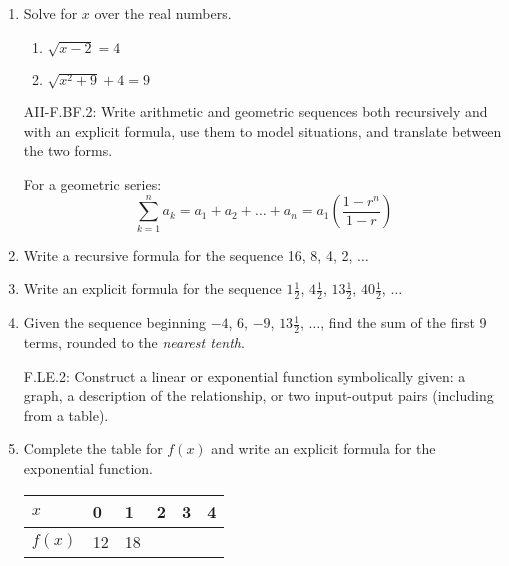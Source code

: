 \documentclass[12pt, twoside]{article}
\begin{document}
\begin{enumerate}[itemsep=0.5cm]
\item Solve for $x$ over the real numbers.
    \begin{multicols}{2}
    \begin{enumerate}[itemsep=0.5cm]
        \item $\sqrt{x-2}=4$
        \item $\sqrt{x^2+9} + 4 = 9$
    \end{enumerate}
    \end{multicols}

\newpage
AII-F.BF.2: Write arithmetic and geometric sequences both recursively and with an explicit formula, use them to model situations, and translate between the two forms.

For a geometric series:
$$\sum_{k=1}^{n} a_k = a_1 + a_2 + \ldots + a_n = a_1 \left( \frac{1-r^n}{1-r} \right)$$

\item Write a recursive formula for the sequence 16, 8, 4, 2, $\ldots$ \vspace{3cm}

\item Write an explicit formula for the sequence $1 \frac{1}{2}$, $4 \frac{1}{2}$, $13 \frac{1}{2}$, $40 \frac{1}{2}$, $\ldots$ \vspace{3cm}


\item Given the sequence beginning  $-4$, 6, $-9$, $13 \frac{1}{2}$, $\ldots$, find the sum of the first 9 terms, rounded to the \emph{nearest tenth}. \vspace{3cm}

F.LE.2: Construct a linear or exponential function symbolically given: a graph, a description of the relationship, or two input-output pairs (including from a table).
\item Complete the table for $f(x)$ and write an explicit formula for the exponential function.
    \begin{center}
    \begin{tabular}{|p{1cm}|p{1cm}|p{1cm}|p{1cm}|p{1cm}|p{1cm}|}
        \hline
        $x$ & 0 & 1 & 2 & 3 & 4 \\
        \hline
        $f(x)$ & 12 & 18 & & & \\[0.25cm]
        \hline
    \end{tabular}
    \end{center}


\end{enumerate}
\end{document}
